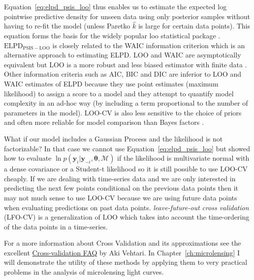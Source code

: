 \documentclass[12pt,dvipsnames]{report}
\renewcommand{\vec}[1]{\boldsymbol{\mathbf{#1}}}
\begin{document}
Equation~\ref{eq:elpd_psis_loo} thus enables us to estimate the expected log pointwise 
predictive density for unseen data using only posterior samples without having 
to re-fit the model (unless Paretko $\hat k$ is large for certain data points). 
This equation forms the basis for the widely popular \textsf{loo} statistical package 
\citep{loo_package}.
$\mathrm{ELPD}_\mathrm{PSIS-LOO}$ is closely related to the WAIC information 
criterion \citep{arXiv:1004.2316} which is an alternative approach to estimating 
ELPD. LOO and WAIC are asymptotically equivalent but LOO is a more robust and less 
biased estimator with finite data \citep{arXiv:1507.04544}.
Other information criteria such as AIC, BIC and DIC are inferior to LOO and WAIC 
estimates of ELPD because they use point estimates (maximum likelihood) to assign 
a score to a model and they attempt to quantify model complexity in an ad-hoc 
way (by including a term proportional to the number of parameters in the model). 
LOO-CV is also less sensitive to the choice of priors and often more reliable 
for model comparison than Bayes factors \citep{10.1214/17-BA1091,arXiv:2003.04026}.

What if our model includes a Gaussian Process and the likelihood is not 
factorizable? In that case we cannot use Equation~\ref{eq:elpd_psis_loo} but 
\citet{arXiv:1810.10559} showed how to evaluate 
$\ln p(\vec y_i\lvert\vec y_{-i},\vec\theta,\mathcal{M})$ if the likelihood is 
multivariate normal with a dense covariance or a Student-t likelihood so it is 
still possible to use LOO-CV cheaply. 
If we are dealing with time-series data and we are only interested in predicting 
the next few points conditional on the previous data points then it may not 
much sense to use LOO-CV because we are using future data points when evaluating 
predictions on past data points. \textsl{leave-future-out cross validation} 
(LFO-CV) \citep{arXiv:1902.06281} is a generalization of LOO which takes into 
account the time-ordering of the data points in a time-series. 

For a more information about Cross Validation and its approximations see the excellent
\href{https://avehtari.github.io/modelselection/CV-FAQ.html}{Cross-validation FAQ}
by Aki Vehtari.
In Chapter~\ref{ch:microlensing} I will demonstrate the utility of these methods by applying 
them to very practical problems in the analysis of microlensing light curves.
\end{document}

